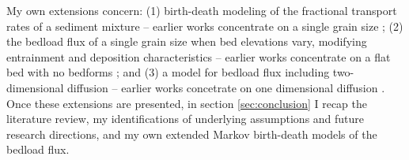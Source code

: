 My own extensions concern: (1) birth-death modeling of the fractional transport rates of a sediment mixture -- earlier works concentrate on a single grain size \citep{Ancey2006,Ancey2008,Turowski2009}; (2) the bedload flux of a single grain size when bed elevations vary, modifying entrainment and deposition characteristics -- earlier works concentrate on a flat bed with no bedforms \citep{Ancey2006,Ancey2008,Turowski2009}; and (3) a model for bedload flux including two-dimensional diffusion -- earlier works concetrate on one dimensional diffusion \citep{Ancey2014,Ancey2015,Heyman2014}. 
Once these extensions are presented, in section \ref{sec:conclusion} I recap the literature review, my identifications of underlying assumptions and future research directions, and my own extended Markov birth-death models of the bedload flux.  
